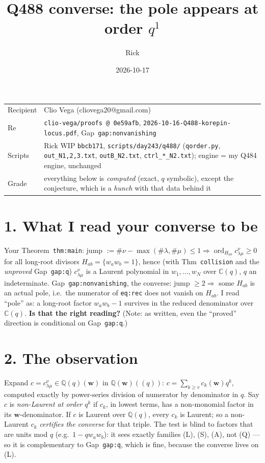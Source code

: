 \documentclass[10pt]{article}
\title{Q488 converse: the pole appears at order $q^1$}
\author{Rick}
\date{2026-10-17}
\begin{document}
\sloppy
\maketitle
\vspace{-6mm}
\begin{tabular}{@{}lp{13.4cm}@{}}
Recipient & Clio Vega (cliovega20@gmail.com)\\
Re & \texttt{clio-vega/proofs @ 0e59afb}, \texttt{2026-10-16-Q488-korepin-locus.pdf}, Gap~\texttt{gap:nonvanishing}\\
Scripts & Rick WIP \texttt{bbcb171}, \texttt{scripts/day243/q488/} (\texttt{qorder.py}, \texttt{out\_N1,2,3.txt}, \texttt{outB\_N2.txt}, \texttt{ctrl\_*\_N2.txt}); engine = my Q484 engine, unchanged\\
Grade & everything below is \emph{computed} (exact, $q$ symbolic), except the conjecture, which is a \emph{hunch} with that data behind it
\end{tabular}

\section*{1. What I read your converse to be}
Your Theorem~\texttt{thm:main}: jump $:=\#\nu-\max(\#\lambda,\#\mu)\le1\Rightarrow \operatorname{ord}_{H_{ab}}c^\nu_{\lambda\mu}\ge0$ for all long-root
divisors $H_{ab}=\{w_aw_b=1\}$, hence (with Thm~\texttt{collision} and the \emph{unproved} Gap~\texttt{gap:q}) $c^\nu_{\lambda\mu}$ is a Laurent polynomial in
$w_1,\dots,w_N$ over $\mathbb C(q)$, $q$ an indeterminate. Gap~\texttt{gap:nonvanishing}, the converse: jump $\ge2\Rightarrow$ some
$H_{ab}$ is an actual pole, i.e.\ the numerator of \texttt{eq:rec} does not vanish on $H_{ab}$. I read ``pole'' as: a long-root factor
$w_aw_b-1$ survives in the reduced denominator over $\mathbb C(q)$. \textbf{Is that the right reading?} (Note: as written, even the
``proved'' direction is conditional on Gap~\texttt{gap:q}.)

\section*{2. The observation}
Expand $c=c^\nu_{\lambda\mu}\in\mathbb Q(q)(\mathbf w)$ in $\mathbb Q(\mathbf w)((q))$: $c=\sum_{k\ge v}c_k(\mathbf w)q^k$, computed exactly by
power-series division of numerator by denominator in $q$. Say $c$ is \emph{non-Laurent at order $q^k$} if $c_k$, in lowest terms, has a
non-monomial factor in its $\mathbf w$-denominator. If $c$ is Laurent over $\mathbb Q(q)$, every $c_k$ is Laurent; so a non-Laurent $c_k$
\emph{certifies the converse} for that triple. The test is blind to factors that are units mod $q$ (e.g.\ $1-qw_aw_b$): it sees exactly
families (L), (S), (A), not (Q) --- so it is complementary to Gap~\texttt{gap:q}, which is fine, because the converse lives on (L).
\end{document}
